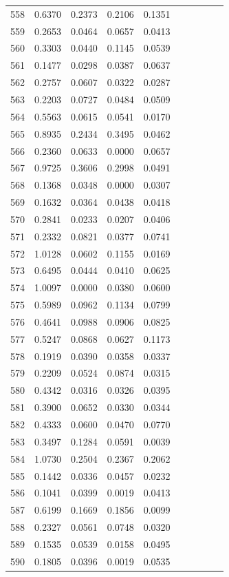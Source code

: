 \begin{table}
\begin{tabular}{cccccccccc}
558& 0.6370& 0.2373& 0.2106& 0.1351\\ 
559& 0.2653& 0.0464& 0.0657& 0.0413\\ 
560& 0.3303& 0.0440& 0.1145& 0.0539\\ 
561& 0.1477& 0.0298& 0.0387& 0.0637\\ 
562& 0.2757& 0.0607& 0.0322& 0.0287\\ 
563& 0.2203& 0.0727& 0.0484& 0.0509\\ 
564& 0.5563& 0.0615& 0.0541& 0.0170\\ 
565& 0.8935& 0.2434& 0.3495& 0.0462\\ 
566& 0.2360& 0.0633& 0.0000& 0.0657\\ 
567& 0.9725& 0.3606& 0.2998& 0.0491\\ 
568& 0.1368& 0.0348& 0.0000& 0.0307\\ 
569& 0.1632& 0.0364& 0.0438& 0.0418\\ 
570& 0.2841& 0.0233& 0.0207& 0.0406\\ 
571& 0.2332& 0.0821& 0.0377& 0.0741\\ 
572& 1.0128& 0.0602& 0.1155& 0.0169\\ 
573& 0.6495& 0.0444& 0.0410& 0.0625\\ 
574& 1.0097& 0.0000& 0.0380& 0.0600\\ 
575& 0.5989& 0.0962& 0.1134& 0.0799\\ 
576& 0.4641& 0.0988& 0.0906& 0.0825\\ 
577& 0.5247& 0.0868& 0.0627& 0.1173\\ 
578& 0.1919& 0.0390& 0.0358& 0.0337\\ 
579& 0.2209& 0.0524& 0.0874& 0.0315\\ 
580& 0.4342& 0.0316& 0.0326& 0.0395\\ 
581& 0.3900& 0.0652& 0.0330& 0.0344\\ 
582& 0.4333& 0.0600& 0.0470& 0.0770\\ 
583& 0.3497& 0.1284& 0.0591& 0.0039\\ 
584& 1.0730& 0.2504& 0.2367& 0.2062\\ 
585& 0.1442& 0.0336& 0.0457& 0.0232\\ 
586& 0.1041& 0.0399& 0.0019& 0.0413\\ 
587& 0.6199& 0.1669& 0.1856& 0.0099\\ 
588& 0.2327& 0.0561& 0.0748& 0.0320\\ 
589& 0.1535& 0.0539& 0.0158& 0.0495\\ 
590& 0.1805& 0.0396& 0.0019& 0.0535\\ 

\end{tabular}
\end{table}
